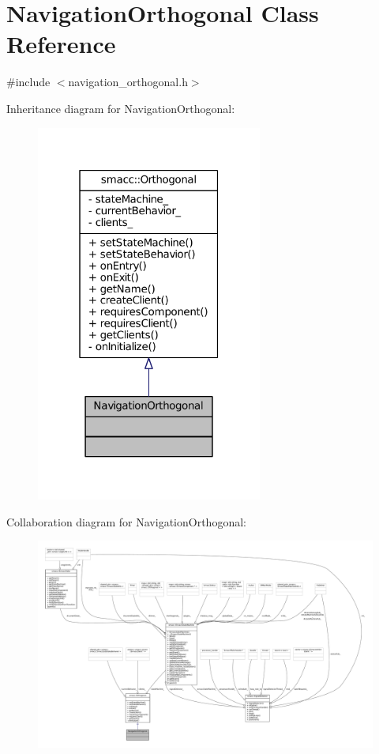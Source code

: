 \hypertarget{classNavigationOrthogonal}{}\section{Navigation\+Orthogonal Class Reference}
\label{classNavigationOrthogonal}


{\ttfamily \#include $<$navigation\+\_\+orthogonal.\+h$>$}



Inheritance diagram for Navigation\+Orthogonal\+:
\nopagebreak
\begin{figure}[H]
\begin{center}
\leavevmode
\includegraphics[width=211pt]{classNavigationOrthogonal__inherit__graph}
\end{center}
\end{figure}


Collaboration diagram for Navigation\+Orthogonal\+:
\nopagebreak
\begin{figure}[H]
\begin{center}
\leavevmode
\includegraphics[width=350pt]{classNavigationOrthogonal__coll__graph}
\end{center}
\end{figure}
